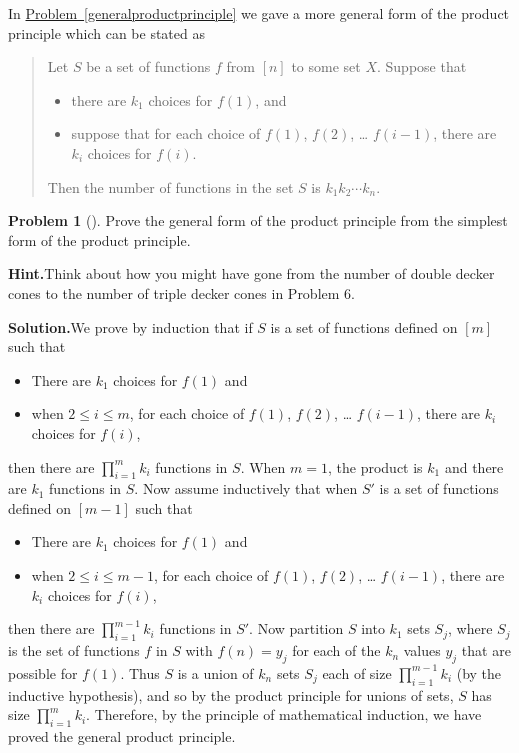\documentclass[10pt,]{book}
\theoremstyle{plain}
\theoremstyle{definition}
\newtheorem{activity}[project]{Problem}
\theoremstyle{definition}
\numberwithin{equation}{chapter}
\begin{document}
In \hyperref[generalproductprinciple]{Problem~\ref{generalproductprinciple}} we gave a more general form of the product principle which can be stated as %
\begin{quote}\hypertarget{blockquote-11}{}
Let \(S\) be a set of functions \(f\) from \([n]\) to some set \(X\).  Suppose that \leavevmode%
\begin{itemize}[label=\textbullet]
\item{}there are \(k_1\) choices for \(f(1)\), and%
\item{}suppose that for each choice of \(f(1)\), \(f(2)\), \dots{} \(f(i-1)\), there are \(k_i\) choices for \(f(i)\).%
\end{itemize}
 Then the number of functions in the set \(S\) is \(k_1k_2\cdots k_n\).%
\end{quote}
\begin{activity}[]\label{generalproductprincipleproof}
Prove the general form of the product principle from the simplest form of the product principle.%
\par\medskip\noindent%
\textbf{Hint.}\quad Think about how you might have gone from the number of double decker cones to the number of triple decker cones in Problem 6.%
\par\medskip\noindent%
\textbf{Solution.}\quad We prove by induction that if \(S\) is a set of functions defined on \([m]\) such that \leavevmode%
\begin{itemize}[label=\textbullet]
\item{}There are \(k_1\) choices for \(f(1)\) and%
\item{}when \(2\le i\le m\), for each choice of \(f(1)\), \(f(2)\), \dots{} \(f(i-1)\), there are \(k_i\) choices for \(f(i)\),%
\end{itemize}
 then there are \(\prod_{i=1}^m k_i\) functions in \(S\). When \(m=1\), the product is \(k_1\) and there are \(k_1\) functions in \(S\). Now assume inductively that when \(S'\) is a set of functions defined on \([m-1]\) such that \leavevmode%
\begin{itemize}[label=\textbullet]
\item{}There are \(k_1\) choices for \(f(1)\) and%
\item{}when \(2\le i\le m-1\), for each choice of \(f(1)\), \(f(2)\), \dots{} \(f(i-1)\), there are \(k_i\) choices for \(f(i)\),%
\end{itemize}
 then there are \(\prod_{i=1}^{m-1} k_i\) functions in \(S'\). Now partition \(S\) into \(k_1\) sets \(S_j\), where \(S_j\) is the set of functions \(f\) in \(S\) with \(f(n) = y_j\) for each of the \(k_n\) values \(y_j\) that are possible for \(f(1)\). Thus \(S\) is a union of \(k_n\) sets \(S_j\) each of size \(\prod_{i=1}^{m-1} k_i\) (by the inductive hypothesis), and so by the product principle for unions of sets, \(S\) has size \(\prod_{i=1}^{m} k_i\). Therefore, by the principle of mathematical induction, we have proved the general product principle.%
\end{activity}
\typeout{************************************************}
\typeout{************************************************}
\end{document}
